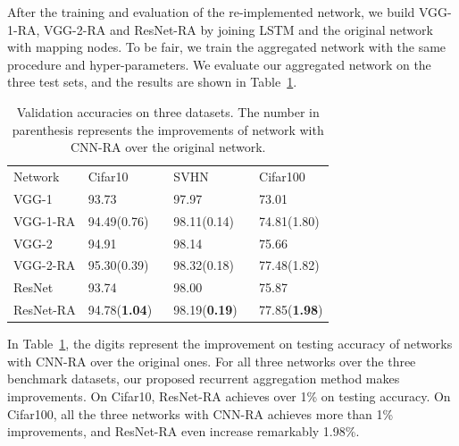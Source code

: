 \documentclass[runningheads]{llncs}
\begin{document}
After the training and evaluation of the re-implemented network, we build VGG-1-RA, VGG-2-RA and ResNet-RA by joining LSTM and the original network with mapping nodes. To be fair, we train the aggregated network with the same procedure and hyper-parameters. We evaluate our aggregated network on the three test sets, and the results are shown in Table~\ref{table:test}.
\setlength{\tabcolsep}{4pt}
\begin{table}
\begin{center}
\caption{Validation accuracies on three datasets. The number in parenthesis represents the improvements of network with CNN-RA over the original network.}
\label{table:test}
\begin{tabular}{l|lll}
\hline\noalign{\smallskip}
Network& Cifar10 & SVHN & Cifar100\\
\noalign{\smallskip}
\hline
\noalign{\smallskip}
VGG-1 & 93.73 & 97.97 & 73.01\\
VGG-1-RA & 94.49(0.76)$\quad$ & 98.11(0.14)$\quad$ & 74.81(1.80)\\
VGG-2 & 94.91 & 98.14 & 75.66\\
VGG-2-RA & 95.30(0.39) & 98.32(0.18) & 77.48(1.82)\\
ResNet & 93.74 & 98.00 & 75.87\\
ResNet-RA & 94.78(\textbf{1.04}) & 98.19(\textbf{0.19}) & 77.85(\textbf{1.98})\\
\hline
\end{tabular}
\end{center}
\end{table}
\setlength{\tabcolsep}{1.4pt}

In Table~\ref{table:test}, the digits represent the improvement on testing accuracy of networks with CNN-RA over the original ones. For all three networks over the three benchmark datasets, our proposed recurrent aggregation method makes improvements. On Cifar10, ResNet-RA achieves over 1\% on testing accuracy. On Cifar100, all the three networks with CNN-RA achieves more than 1\% improvements, and ResNet-RA even increase remarkably 1.98\%.
\end{document}
